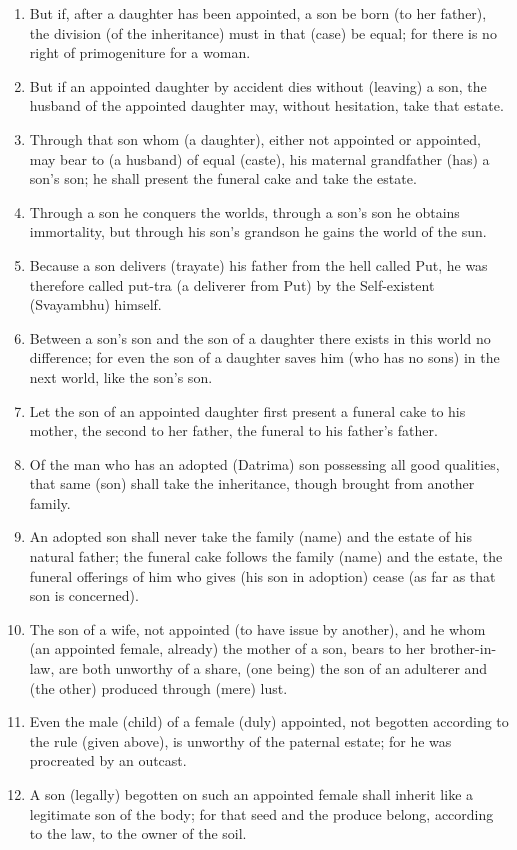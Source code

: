 \begin{enumerate}
\item But if, after a daughter has been appointed, a son be born (to her father), the division (of the inheritance) must in that (case) be equal; for there is no right of primogeniture for a woman.
\item But if an appointed daughter by accident dies without (leaving) a son, the husband of the appointed daughter may, without hesitation, take that estate.
\item Through that son whom (a daughter), either not appointed or appointed, may bear to (a husband) of equal (caste), his maternal grandfather (has) a son's son; he shall present the funeral cake and take the estate.
\item Through a son he conquers the worlds, through a son's son he obtains immortality, but through his son's grandson he gains the world of the sun.
\item Because a son delivers (trayate) his father from the hell called Put, he was therefore called put-tra (a deliverer from Put) by the Self-existent (Svayambhu) himself.
\item Between a son's son and the son of a daughter there exists in this world no difference; for even the son of a daughter saves him (who has no sons) in the next world, like the son's son.
\item Let the son of an appointed daughter first present a funeral cake to his mother, the second to her father, the funeral to his father's father.
\item Of the man who has an adopted (Datrima) son possessing all good qualities, that same (son) shall take the inheritance, though brought from another family.
\item An adopted son shall never take the family (name) and the estate of his natural father; the funeral cake follows the family (name) and the estate, the funeral offerings of him who gives (his son in adoption) cease (as far as that son is concerned).
\item The son of a wife, not appointed (to have issue by another), and he whom (an appointed female, already) the mother of a son, bears to her brother-in-law, are both unworthy of a share, (one being) the son of an adulterer and (the other) produced through (mere) lust.
\item Even the male (child) of a female (duly) appointed, not begotten according to the rule (given above), is unworthy of the paternal estate; for he was procreated by an outcast.
\item A son (legally) begotten on such an appointed female shall inherit like a legitimate son of the body; for that seed and the produce belong, according to the law, to the owner of the soil.

\end{enumerate}
